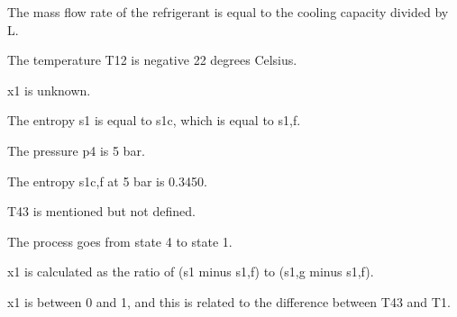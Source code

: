 The mass flow rate of the refrigerant is equal to the cooling capacity divided by L.

The temperature T12 is negative 22 degrees Celsius.

x1 is unknown.

The entropy s1 is equal to s1c, which is equal to s1,f.

The pressure p4 is 5 bar.

The entropy s1c,f at 5 bar is 0.3450.

T43 is mentioned but not defined.

The process goes from state 4 to state 1.

x1 is calculated as the ratio of (s1 minus s1,f) to (s1,g minus s1,f).

x1 is between 0 and 1, and this is related to the difference between T43 and T1.
